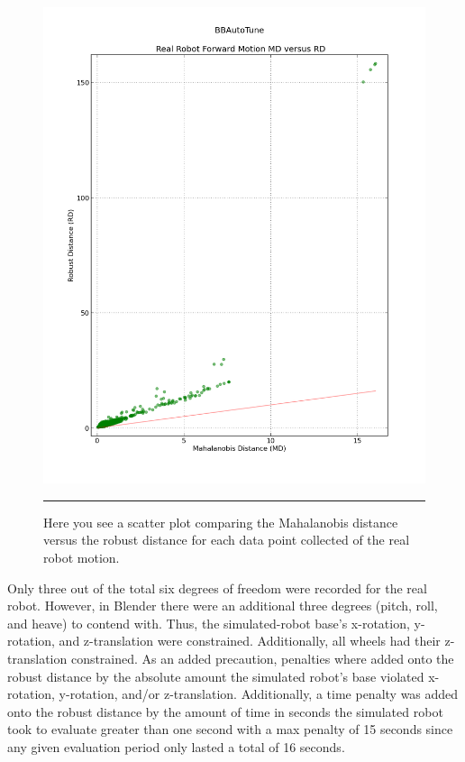 \begin{figure}[htbp]
\centering
\includegraphics[scale=0.5]{../Figures/Chapter4/real_robot_md_vs_rd.png}
\rule{35em}{0.5pt}
\caption[Real Robot Forward Motion MD versus RD]{Here you see a scatter plot comparing the Mahalanobis distance versus the robust distance for each data point collected of the real robot motion.}
\label{fig:real_robot_md_vs_rd}
\end{figure}

Only three out of the total six degrees of freedom were recorded for the real robot. However, in Blender there were an additional three degrees (pitch, roll, and heave) to contend with.  Thus, the simulated-robot base's x-rotation, y-rotation, and z-translation were constrained. Additionally, all wheels had their z-translation constrained. As an added precaution, penalties where added onto the robust distance by the absolute amount the simulated robot's base violated x-rotation, y-rotation, and/or z-translation. Additionally, a time penalty was added onto the robust distance by the amount of time in seconds the simulated robot took to evaluate greater than one second with a max penalty of 15 seconds since any given evaluation period only lasted a total of 16 seconds.

